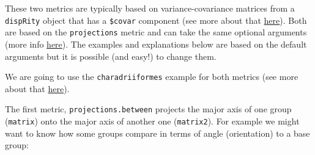 \documentclass[
]{book}
\newenvironment{Shaded}{\begin{snugshade}}{\end{snugshade}}
\newcommand{\CommentTok}[1]{\textcolor[rgb]{0.56,0.35,0.01}{\textit{#1}}}
\newcommand{\DataTypeTok}[1]{\textcolor[rgb]{0.13,0.29,0.53}{#1}}
\newcommand{\DecValTok}[1]{\textcolor[rgb]{0.00,0.00,0.81}{#1}}
\newcommand{\KeywordTok}[1]{\textcolor[rgb]{0.13,0.29,0.53}{\textbf{#1}}}
\newcommand{\NormalTok}[1]{#1}
\newcommand{\OperatorTok}[1]{\textcolor[rgb]{0.81,0.36,0.00}{\textbf{#1}}}
\newcommand{\StringTok}[1]{\textcolor[rgb]{0.31,0.60,0.02}{#1}}
\begin{document}
These two metrics are typically based on variance-covariance matrices from a \texttt{dispRity} object that has a \texttt{\$covar} component (see more about that \protect\hyperlink{covar}{here}).
Both are based on the \texttt{projections} metric and can take the same optional arguments (more info \protect\hyperlink{projections}{here}).
The examples and explanations below are based on the default arguments but it is possible (and easy!) to change them.

We are going to use the \texttt{charadriiformes} example for both metrics (see more about that \protect\hyperlink{covar}{here}).

\begin{Shaded}
\end{Shaded}

The first metric, \texttt{projections.between} projects the major axis of one group (\texttt{matrix}) onto the major axis of another one (\texttt{matrix2}).
For example we might want to know how some groups compare in terms of angle (orientation) to a base group:
\end{document}
